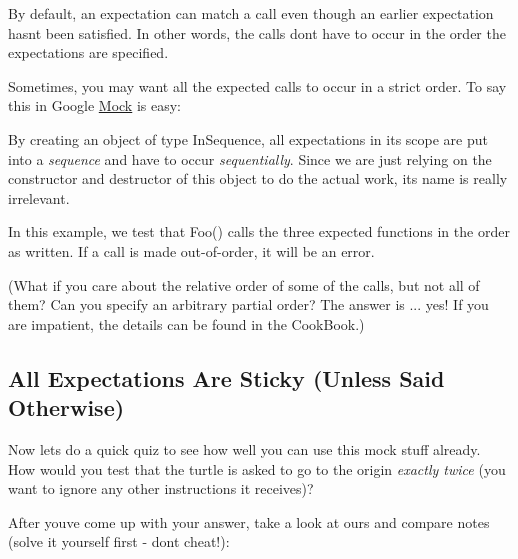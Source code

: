 By default, an expectation can match a call even though an earlier expectation hasn\textquotesingle{}t been satisfied. In other words, the calls don\textquotesingle{}t have to occur in the order the expectations are specified.

Sometimes, you may want all the expected calls to occur in a strict order. To say this in Google \mbox{\hyperlink{class_mock}{Mock}} is easy\+:


\begin{DoxyCode}{0}
\DoxyCodeLine{  \{}
\DoxyCodeLine{}
\DoxyCodeLine{  \}}
\DoxyCodeLine{\}}
\end{DoxyCode}


By creating an object of type {\ttfamily In\+Sequence}, all expectations in its scope are put into a {\itshape sequence} and have to occur {\itshape sequentially}. Since we are just relying on the constructor and destructor of this object to do the actual work, its name is really irrelevant.

In this example, we test that {\ttfamily Foo()} calls the three expected functions in the order as written. If a call is made out-\/of-\/order, it will be an error.

(What if you care about the relative order of some of the calls, but not all of them? Can you specify an arbitrary partial order? The answer is ... yes! If you are impatient, the details can be found in the Cook\+Book.)

\subsection*{All Expectations Are Sticky (Unless Said Otherwise)}

Now let\textquotesingle{}s do a quick quiz to see how well you can use this mock stuff already. How would you test that the turtle is asked to go to the origin {\itshape exactly twice} (you want to ignore any other instructions it receives)?

After you\textquotesingle{}ve come up with your answer, take a look at ours and compare notes (solve it yourself first -\/ don\textquotesingle{}t cheat!)\+:


\begin{DoxyCode}{0}
\end{DoxyCode}



